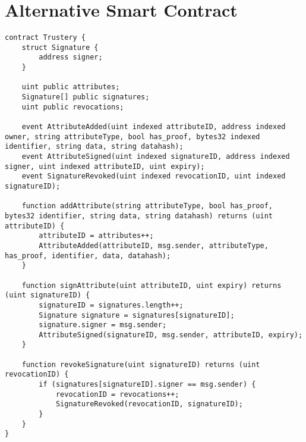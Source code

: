 \documentclass[12pt,a4paper]{report}
\begin{document}
	\section{Alternative Smart Contract}
	\begin{lstlisting}
contract Trustery {
    struct Signature {
        address signer;
    }

    uint public attributes;
    Signature[] public signatures;
    uint public revocations;

    event AttributeAdded(uint indexed attributeID, address indexed owner, string attributeType, bool has_proof, bytes32 indexed identifier, string data, string datahash);
    event AttributeSigned(uint indexed signatureID, address indexed signer, uint indexed attributeID, uint expiry);
    event SignatureRevoked(uint indexed revocationID, uint indexed signatureID);

    function addAttribute(string attributeType, bool has_proof, bytes32 identifier, string data, string datahash) returns (uint attributeID) {
        attributeID = attributes++;
        AttributeAdded(attributeID, msg.sender, attributeType, has_proof, identifier, data, datahash);
    }

    function signAttribute(uint attributeID, uint expiry) returns (uint signatureID) {
        signatureID = signatures.length++;
        Signature signature = signatures[signatureID];
        signature.signer = msg.sender;
        AttributeSigned(signatureID, msg.sender, attributeID, expiry);
    }

    function revokeSignature(uint signatureID) returns (uint revocationID) {
        if (signatures[signatureID].signer == msg.sender) {
            revocationID = revocations++;
            SignatureRevoked(revocationID, signatureID);
        }
    }
}
	\end{lstlisting}
\end{document}
